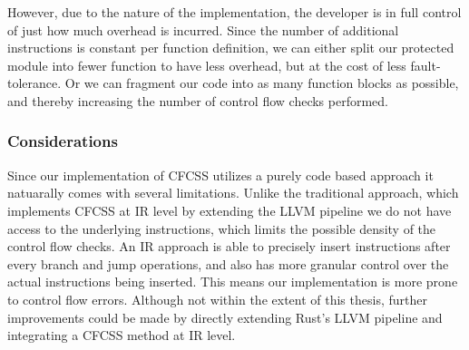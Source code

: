However, due to the nature of the implementation, the developer is in full control of just how much overhead is incurred. Since the number of additional instructions is constant per function definition, we can either split our protected module into fewer function to have less overhead, but at the cost of less fault-tolerance. Or we can fragment our code into as many function blocks as possible, and thereby increasing the number of control flow checks performed.

\subsubsection{Considerations}

Since our implementation of CFCSS utilizes a purely code based approach it natuarally comes with several limitations. Unlike the traditional approach, which implements CFCSS at IR level by extending the LLVM pipeline we do not have access to the underlying instructions, which limits the possible density of the control flow checks. An IR approach is able to precisely insert instructions after every branch and jump operations, and also has more granular control over the actual instructions being inserted. This means our implementation is more prone to control flow errors. Although not within the extent of this thesis, further improvements could be made by directly extending Rust's LLVM pipeline and integrating a CFCSS method at IR level.

